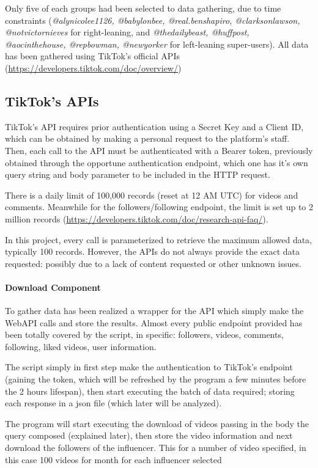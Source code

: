 Only five of each groups had been selected to data gathering, due to time constraints (\textit{@alynicolee1126, @babylonbee, @real.benshapiro, @clarksonlawson, @notvictornieves} for right-leaning, and \textit{@thedailybeast, @huffpost, @aocinthehouse, @repbowman, @newyorker} for left-leaning super-users). All data has been gathered using TikTok's official APIs (\url{https://developers.tiktok.com/doc/overview/})

\subsection{TikTok's APIs}

TikTok's API requires prior authentication using a Secret Key and a Client ID, which can be obtained by making a personal request to the platform's staff. Then, each call to the API must be authenticated with a Bearer token, previously obtained through the opportune authentication endpoint, which one has it's own query string and body parameter to be included in the HTTP request.

There is a daily limit of 100,000 records (reset at 12 AM UTC) for videos and comments. Meanwhile for the followers/following endpoint, the limit is set up to 2 million records (\url{https://developers.tiktok.com/doc/research-api-faq/}).

In this project, every call is parameterized to retrieve the maximum allowed data, typically 100 records. However, the APIs do not always provide the exact data requested: possibly due to a lack of content requested or other unknown issues.

\paragraph*{Download Component}

To gather data has been realized a wrapper for the API which simply make the WebAPI calls and store the results.
Almost every public endpoint provided has been totally covered by the script, in specific: followers, videos, comments, following, liked videos, user information.

The script simply in first step make the authentication to TikTok's endpoint (gaining the token, which will be refreshed by the program a few minutes before the 2 hours lifespan), then start executing the batch of data required; storing each response in a json file (which later will be analyzed).

The program will start executing the download of videos passing in the body the query composed (explained later), then store the video information and next download the followers of the influencer.
This for a number of video specified, in this case 100 videos for month for each influencer selected %

